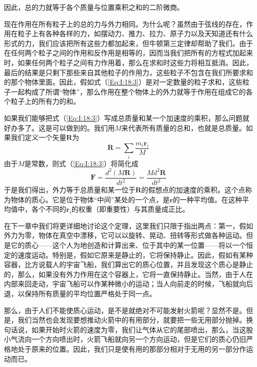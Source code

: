 因此，总的力就等于各个质量与位置乘积之和的二阶微商。

现在作用在所有粒子上的总的力与外力相同。为什么呢？虽然由于弦线的存在，作用在粒子上有各种各样的力，如摆动力、推力、拉力、原子力以及天知道还有什么形式的力，我们应该把所有这些力都加起来，但牛顿第三定律却帮助了我们。由于在任何两个粒子之间的作用和反作用是相等的，因而当我们把所有的方程式加起来时，如果任何两个粒子之间有力作用着，那么在求和时这些力将相互抵消。因此，最后的结果是只剩下那些来自其他粒子的作用力，这些粒子不包含在我们所要求和的那个物体里面。因此，假如式（\ref{Eq:I:18:3}）是对一定数量的粒子求和，这些粒子一起构成了所谓“物体”，那么作用在整个物体上的外力就等于作用在组成它的各个粒子上的所有力的和。

如果我们能够把式（\ref{Eq:I:18:3}）写成总质量和某一个加速度的乘积，那么问题就好办多了。这是可以做到的。我们用$M$来代表所有质量的总和，也就是总质量。如果我们定义一个矢量$\boldsymbol{R}$为
\begin{equation}
    \label{Eq:I:18:4}
    \boldsymbol{R}=\sum_i \frac{m_i\boldsymbol{r}_i}{M}
\end{equation}
由于$M$是常数，则式（\ref{Eq:I:18:3}）将简化成
\begin{equation}
    \label{Eq:I:18:5}
    \boldsymbol{F}=\frac{d^2(M\boldsymbol{R})}{dt^2}=\frac{Md^2\boldsymbol{R}}{dt^2}
\end{equation}
于是我们得出，外力等于总质量和某一位于$\boldsymbol{R}$的假想点的加速度的乘积。这个点称为物体的质心。它是位于物体“中间”某处的一个点，是$\boldsymbol{r}$的一种平均值。在这种平均值中，各个不同的$\boldsymbol{r}_i$的权重（即重要性）与其质量成正比。

在下一章中我们将更详细地讨论这个定理，这里我们只限于指出两点：第一，假如外力为零，物体在真空中漂移，它可以以旋转、晃动、扭转等形式做各种运动。但是它的质心——这个人为地创造和计算出来、位于其中的某一位置——将以一个恒定的速度运动。特别是，假如它原来是静止的，它将保持静止。因此，假如有某种容器，比方说载人的宇宙飞船，我们算出它的质心位置，并且发现这个质心是静止的，那么，如果没有外力作用在这个容器上，它将一直保持静止。当然，由于人在内部来回走动，宇宙飞船可以作某种微小的运动；当人向前走的时候，飞船就向后退，以保持所有质量的平均位置严格处于同一点。

那么，由于人们不能使质心运动，是不是就绝对不可能发射火箭呢？显然不是。但是，我们当然也会发现要想推动火箭中的有用部分，就要把一些无用部分抛掉。换句话说，如果开始时火箭的速度为零，我们让气体从它的尾部喷出，那么，当这股小气流向一个方向喷出时，火箭飞船就向另一个方向运动，但是它们的质心仍旧严格地处于原来的位置。因此，我们只是使有用的那部分相对于无用的另一部分作运动而已。

